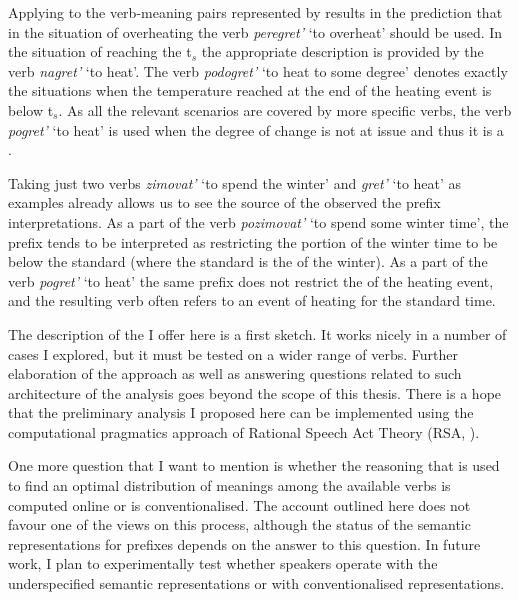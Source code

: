Applying  to the verb-meaning pairs represented by  results in the prediction that in the situation of overheating the verb \textit{peregret'} `to overheat' should be used. In the situation of reaching the t$_s$ the appropriate description is provided by the verb \textit{nagret'} `to heat'. The verb \textit{podogret'} `to heat to some degree' denotes exactly the situations when the temperature reached at the end of the heating event is below t$_s$. As all the relevant scenarios are covered by more specific verbs, the verb \textit{pogret'} `to heat' is used when the degree of change is not at issue and thus it is a .

Taking just two verbs \textit{zimovat'} `to spend the winter' and \textit{gret'} `to heat' as examples already allows us to see the source of the observed  the prefix interpretations. As a part of the verb \textit{pozimovat'} `to spend some winter time', the prefix  tends to be interpreted as restricting the portion of the winter time to be below the standard (where the standard is the  of the winter). As a part of the verb \textit{pogret'} `to heat' the same prefix does not restrict the  of the heating event, and the resulting verb often refers to an event of heating for the standard time. 

The description of the  I offer here is a first sketch. It works nicely in a number of cases I explored, but it must be tested on a wider range of verbs. Further elaboration of the approach as well as answering questions related to such architecture of the analysis goes beyond the scope of this thesis. There is a hope that the preliminary analysis I proposed here can be implemented using the computational pragmatics approach of Rational Speech Act Theory (RSA, \citealt{Franke:09, FrankGoodman:12, GoodmanStuhlmuller:13, FrankeJager:15, GoodmanFrank:16}). 

One more question that I want to mention is whether the reasoning that is used to find an optimal distribution of meanings among the available verbs is computed online or is conventionalised. The account outlined here does not favour one of the views on this process, although the status of the semantic representations for prefixes depends on the answer to this question. In future work, I plan to experimentally test whether speakers operate with the underspecified semantic representations or with conventionalised representations. 

